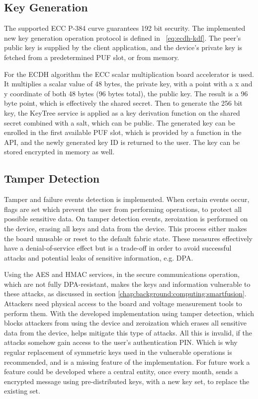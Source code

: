 \subsection{Key Generation}\label{chap:implementation:services:key-generation}

The supported \ac{ECC} P-384 curve guarantees 192 bit security.
The implemented new key generation operation protocol is defined in ~\ref{eq:ecdh-kdf}.
The peer's public key is supplied by the client application, and the device's private key is fetched from a predetermined PUF slot, or from memory.

For the ECDH algorithm the ECC scalar multiplication board accelerator is used. It multiplies a scalar value of 48 bytes, the private key, with a point with a x and y coordinate of both 48 bytes (96 bytes total), the public key.
The result is a 96 byte point, which is effectively the shared secret.
Then to generate the 256 bit key, the KeyTree service is applied as a key derivation function on the shared secret combined with a salt, which can be public.
The generated key can be enrolled in the first available PUF slot, which is provided by a function in the API, and the newly generated key ID is returned to the user.
The key can be stored encrypted in memory as well.

\subsection{Tamper Detection}\label{chap:implementation:services:tamper-detection}

Tamper and failure events detection is implemented. When certain events occur, flags are set which prevent the user from performing operations, to protect all possible sensitive data.
On tamper detection events, zeroization is performed on the device, erasing all keys and data from the device. This process either makes the board unusable or reset to the default fabric state.
These measures effectively have a denial-of-service effect but is a trade-off in order to avoid successful attacks and potential leaks of sensitive information, e.g. \ac{DPA}.

Using the AES and HMAC services, in the secure communications operation, which are not fully DPA-resistant, makes the keys and information vulnerable to these attacks, as discussed in section \ref{chap:background:computing:smartfusion}.
Attackers need physical access to the board and voltage measurement tools to perform them.
With the developed implementation using tamper detection, which blocks attackers from using the device and zeroization which erases all sensitive data from the device, helps mitigate this type of attacks.
All this is invalid, if the attacks somehow gain access to the user's authentication PIN.
Which is why regular replacement of symmetric keys used in the vulnerable operations is recommended, and is a missing feature of the implementation.
For future work a feature could be developed where a central entity, once every month, sends a encrypted message using pre-distributed keys, with a new key set, to replace the existing set.

